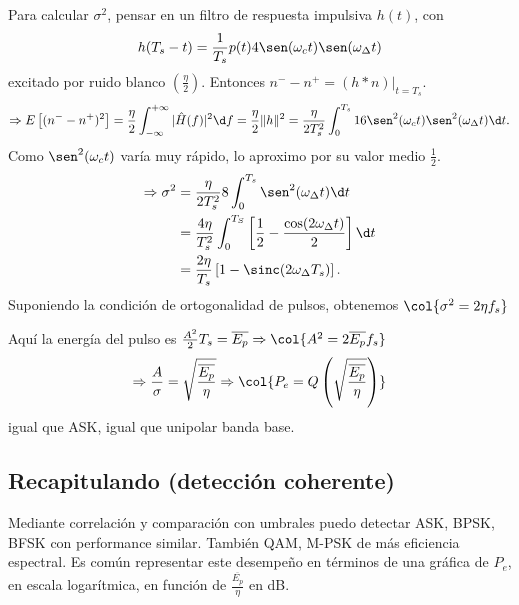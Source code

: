     Para calcular $\sigma^2$, pensar en un filtro de respuesta impulsiva $h(t)$, con
    \[h(T_s-t)=\frac{1}{T_s} p(t) 4 \sen(\omega_c t)\sen(\omega_\Delta t)\]
    excitado por ruido blanco $(\frac{\eta}{2})$.  Entonces $n^- - n^+ = (h\ast
    n)\big|_{t=T_s}$.
    \[\Rightarrow E\left[(n^- - n^+)^2\right] = \frac{\eta}{2} \int_{-\infty}^{+\infty} |\hat{H}(f)|^2 \d f= \frac{\eta}{2} \|h\|^2 = \frac{\eta}{2T_s^2} \int_0^{T_s} 16 \sen^2(\omega_c t)\sen^2(\omega_\Delta t)\d t.\]
    Como $\sen^2(\omega_c t)$ varía muy rápido, lo aproximo por su valor medio
    $\frac{1}{2}$.
    \begin{align*}
        \Rightarrow \sigma^2 &= \frac{\eta}{2T_s^2}8\int_0^{T_s}\sen^2(\omega_\Delta t)\d t\\
        &= \frac{4\eta}{T_s^2} \int_0^{T_S}\left[\frac{1}{2} - \frac{\cos(2\omega_\Delta t)}{2}\right]\d t\\
        &= \frac{2\eta}{T_s} \left[1 - \sinc(2\omega_\Delta
        T_s)\right].
    \end{align*}
    Suponiendo la condición de ortogonalidad de pulsos, obtenemos
    $\col{\sigma^2 = 2\eta f_s}$

    Aquí la energía del pulso es $\frac{A^2}{2} T_s = \overline{E_p} \Rightarrow \col{A^2 = 2\overline{E_p} f_s}$
    \[\Rightarrow \frac{A}{\sigma} = \sqrt{\frac{\overline{E_p}}{\eta}} \Rightarrow \col{P_e=Q\left(\sqrt{\frac{\overline{E_p}}{\eta}}\right)}\]
    igual que ASK, igual que unipolar banda base.


\subsection*{Recapitulando (detección coherente)}

Mediante correlación y comparación con umbrales puedo detectar
ASK, BPSK, BFSK con performance similar. También QAM, M-PSK de más
eficiencia espectral. Es común representar este desempeño en
términos de una gráfica de $P_e$, en escala logarítmica, en
función de $\frac{\overline{E_p}}{\eta}$ en dB.



